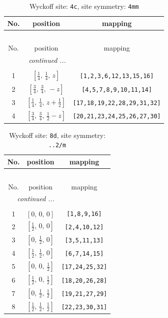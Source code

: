\documentclass[fleqn,8pt]{jsarticle}
\begin{document}
\renewcommand{\arraystretch}{1.2}
\begin{longtable}{ccc}
\caption{Wyckoff site: {\tt 4c}, site symmetry: {\tt 4mm}}
 \\
 \hline \hline
No. & position & mapping \\ \hline \endfirsthead

\multicolumn{2}{l}{\tablename\ \thetable{}} \\
 \hline \hline
No. & position & mapping \\ \hline \endhead

 \hline \hline
\multicolumn{2}{r}{\footnotesize\it continued ...} \\ \endfoot

 \hline \hline
\multicolumn{2}{r}{} \\ \endlastfoot

1 & $\left[ \frac{1}{4},\, \frac{1}{4},\, z \right]$ & {\tt [1,2,3,6,12,13,15,16]} \\ \hline
2 & $\left[ \frac{3}{4},\, \frac{3}{4},\, - z \right]$ & {\tt [4,5,7,8,9,10,11,14]} \\ \hline
3 & $\left[ \frac{1}{4},\, \frac{1}{4},\, z + \frac{1}{2} \right]$ & {\tt [17,18,19,22,28,29,31,32]} \\ \hline
4 & $\left[ \frac{3}{4},\, \frac{3}{4},\, \frac{1}{2} - z \right]$ & {\tt [20,21,23,24,25,26,27,30]} \\
\end{longtable}
\renewcommand{\arraystretch}{1.2}
\begin{longtable}{ccc}
\caption{Wyckoff site: {\tt 8d}, site symmetry: {\tt ..2/m}}
 \\
 \hline \hline
No. & position & mapping \\ \hline \endfirsthead

\multicolumn{2}{l}{\tablename\ \thetable{}} \\
 \hline \hline
No. & position & mapping \\ \hline \endhead

 \hline \hline
\multicolumn{2}{r}{\footnotesize\it continued ...} \\ \endfoot

 \hline \hline
\multicolumn{2}{r}{} \\ \endlastfoot

1 & $\left[ 0,\, 0,\, 0 \right]$ & {\tt [1,8,9,16]} \\ \hline
2 & $\left[ \frac{1}{2},\, 0,\, 0 \right]$ & {\tt [2,4,10,12]} \\ \hline
3 & $\left[ 0,\, \frac{1}{2},\, 0 \right]$ & {\tt [3,5,11,13]} \\ \hline
4 & $\left[ \frac{1}{2},\, \frac{1}{2},\, 0 \right]$ & {\tt [6,7,14,15]} \\ \hline
5 & $\left[ 0,\, 0,\, \frac{1}{2} \right]$ & {\tt [17,24,25,32]} \\ \hline
6 & $\left[ \frac{1}{2},\, 0,\, \frac{1}{2} \right]$ & {\tt [18,20,26,28]} \\ \hline
7 & $\left[ 0,\, \frac{1}{2},\, \frac{1}{2} \right]$ & {\tt [19,21,27,29]} \\ \hline
8 & $\left[ \frac{1}{2},\, \frac{1}{2},\, \frac{1}{2} \right]$ & {\tt [22,23,30,31]} \\
\end{longtable}
\end{document}
